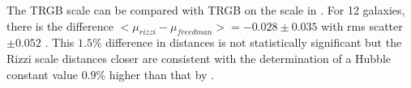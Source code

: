 \documentclass[twocolumn]{aastex63}
\begin{document}



The \citet{2007ApJ...661..815R} TRGB scale can be compared with TRGB on the scale in \citet{2019ApJ...882...34F}.  For 12 galaxies, there is the difference $<\mu_{rizzi} - \mu_{freedman}> = -0.028\pm0.035$ with rms scatter $\pm0.052$ \citep{2022ApJ...932...15A}.  This $1.5\%$ difference in distances is not statistically significant but the Rizzi scale distances closer are consistent with the \citet{2022ApJ...932...15A} determination of a Hubble constant value $0.9\%$ higher than that by \citet{2019ApJ...882...34F}.  
\end{document}
